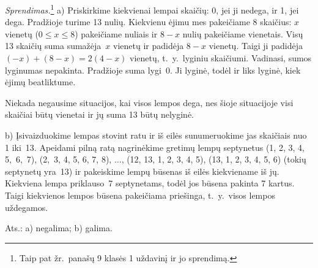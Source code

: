 \documentclass[11pt,a4paper]{article}
\begin{document}
\textit{Sprendimas.}\footnote{Taip pat žr.~panašų 9 klasės 1 uždavinį ir jo sprendimą.} a) Priskirkime kiekvienai lempai skaičių: 0, jei ji nedega, ir 1, jei dega. Pradžioje turime 13 nulių. Kiekvienu ėjimu mes pakeičiame 8 skaičius: $x$ vienetų ($0\leq x\leq8$) pakeičiame nuliais ir $8-x$ nulių pakeičiame vienetais. Visų 13 skaičių suma sumažėja~$x$ vienetų ir padidėja $8-x$ vienetų. Taigi ji padidėja $(-x)+(8-x)=2(4-x)$ vienetų, t.~y.~lyginiu skaičiumi. Vadinasi, sumos lyginumas nepakinta. Pradžioje suma lygi~0. Ji lyginė, todėl ir liks lyginė, kiek ėjimų beatliktume.

Niekada negausime situacijos, kai visos lempos dega, nes šioje situacijoje visi skaičiai būtų vienetai ir jų suma 13 būtų nelyginė.

b) Įsivaizduokime lempas stovint ratu ir iš eilės sunumeruokime jas skaičiais nuo 1 iki~13. Apeidami pilną ratą nagrinėkime gretimų lempų septynetus (1, 2, 3, 4, 5,~6,~7), (2,~3, 4, 5, 6, 7, 8), $\ldots$, (12, 13, 1, 2, 3, 4, 5), (13, 1, 2, 3, 4, 5, 6) (tokių septynetų yra~13) ir pakeiskime lempų būsenas iš eilės kiekviename iš jų. Kiekviena lempa priklauso~7 septynetams, todėl jos būsena pakinta 7 kartus. Taigi kiekvienos lempos būsena pakeičiama priešinga, t.~y.~visos lempos uždegamos.

\begin{flushright}
     Ats.: a) negalima; b) galima.
\end{flushright}
 \vspace{0,6cm}  
\end{document}

